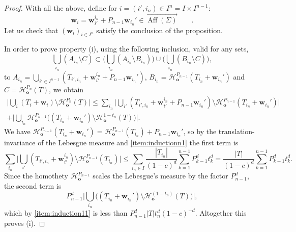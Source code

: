 \documentclass[10pt]{amsart}
\begin{document}
\begin{proof}
With all the above, define for $i=(i',i_n)\in I^n=I\times I^{n-1}$:
\begin{equation*}
 \mathbf{w}_i=\mathbf{w}^{i_n}_{i'}+P_{n-1}\mathbf{w}_{i_n}'\in \overrightarrow{\operatorname{Aff}(\Sigma)}\qquad.
\end{equation*}
Let us check that $(\mathbf{w}_i)_{i \in I^n}$ satisfy the conclusion of the proposition. 

In order to prove property (i), using the following inclusion, valid for any sets,
\[ \bigcup_{i_n} (A_{i_n} \setminus C) \subset \Big(\bigcup_{i_n} (A_{i_n} \setminus B_{i_n})\Big) \cup \Big(\bigcup_{i_n} (B_{i_n} \setminus C)\Big),\]
to $A_{i_n} = \bigcup_{i' \in I^{n-1}} (T_{i',i_n}+\mathbf{w}_{i'}^{i_n}+P_{n-1}\mathbf{w}_{i_n}')$, $B_{i_n} = \mathcal{H}_{\mathbf{o}}^{P_{n-1}}(T_{i_n} + \mathbf{w}_{i_n}')$ and $C= \mathcal{H}_{\mathbf{o}}^{P_{n}}(T)$, we obtain
\begin{multline*}
    \Big| \bigcup_i (T_i + \mathbf{w}_i)\setminus \mathcal{H}_{\mathbf{o}}^{P_n}(T) \Big| \leq 
\sum_{i_n} \Big|\bigcup_{i'} (T_{i',i_n} + \mathbf{w}_{i'}^{i_n} + P_{n-1} \mathbf{w}_{i_n}')\setminus \mathcal{H}_{\mathbf{o}}^{P_{n-1}}(T_{i_n} + \mathbf{w}_{i_n}')\Big|\\
+ \Big| \bigcup_{i_n} \mathcal{H}_{\mathbf{o}}^{P_{n-1}}\big((T_{i_n} + \mathbf{w}_{i_n}') \setminus \mathcal{H}_{\mathbf{o}}^{1-t_n}(T)\big)\Big|.
\end{multline*} 
We have $\mathcal{H}_{\mathbf{o}}^{P_{n-1}}(T_{i_n} + \mathbf{w}_{i_n}') = \mathcal{H}_{\mathbf{o}}^{P_{n-1}}(T_{i_n}) + P_{n-1}\mathbf{w}_{i_n}'$, so by the translation-invariance of the Lebesgue measure and \ref{item:inductionn1} the first term is
\[\sum_{i_n} \Big|\bigcup_{i'} (T_{i',i_n} + \mathbf{w}_{i'}^{i_n})\setminus \mathcal{H}_{\mathbf{o}}^{P_{n-1}}(T_{i_n})\Big| \leq \sum_{i_n\in I} \frac{ |T_{i_n}|}{(1-c)^d}\sum_{k=1}^{n-1} P_{k-1}^dt_k^d = \frac{ |T|}{(1-c)^d}\sum_{k=1}^{n-1} P_{k-1}^dt_k^d.\]
Since the homothety $\mathcal{H}_{\mathbf{o}}^{P_{n-1}}$ scales the Lebesgue's measure by the factor $P_{n-1}^d$, the second term is
\[ P_{n-1}^d \Big| \bigcup_{i_n} \big( (T_{i_n} + \mathbf{w}_{i_n}') \setminus \mathcal{H}_{\mathbf{o}}^{(1-t_n)}(T)\big)\Big|,\]
which by \ref{item:induction11} is less than $P_{n-1}^d|T| t_n^d(1-c)^{-d}$. Altogether this proves (i).


\end{proof}
\end{document}
